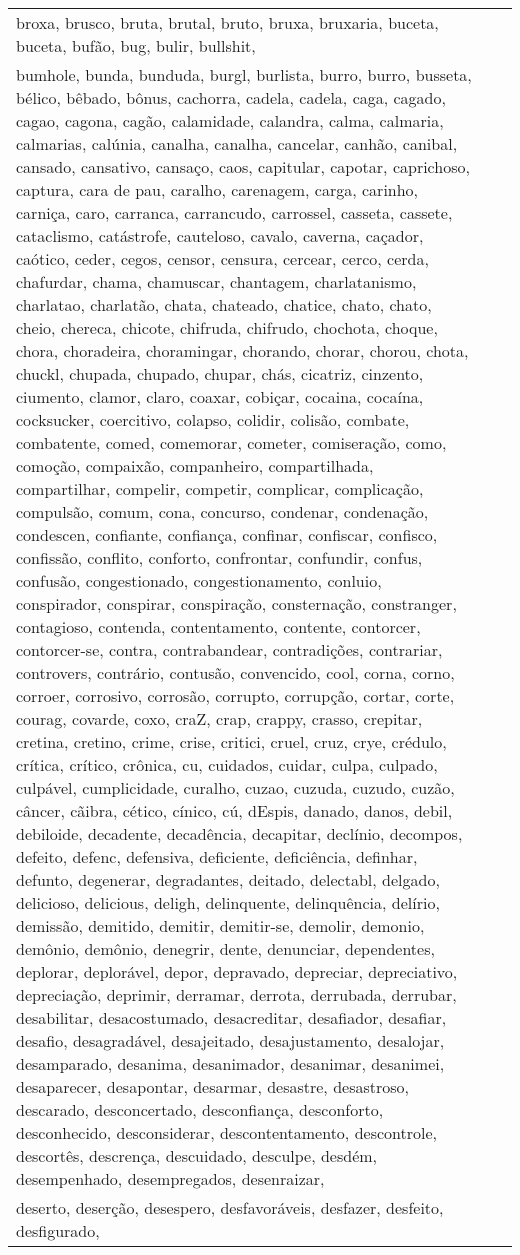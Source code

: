 \begin{longtable}{|*3{p{15cm}|}}
broxa, brusco, bruta, brutal, bruto, bruxa, bruxaria, buceta, buceta, bufão, bug, bulir, bullshit, \\ bumhole, bunda, bunduda, burgl, burlista, burro, burro, busseta, bélico, bêbado, bônus, cachorra, cadela, cadela, caga, cagado, cagao, cagona, cagão, calamidade, calandra, calma, calmaria, calmarias, calúnia, canalha, canalha, cancelar, canhão, canibal, cansado, cansativo, cansaço, caos, capitular, capotar, caprichoso, captura, cara de pau, caralho, carenagem, carga, carinho, carniça, caro, carranca, carrancudo, carrossel, casseta, cassete, cataclismo, catástrofe, cauteloso, cavalo, caverna, caçador, caótico, ceder, cegos, censor, censura, cercear, cerco, cerda, chafurdar, chama, chamuscar, chantagem, charlatanismo, charlatao, charlatão, chata, chateado, chatice, chato, chato, cheio, chereca, chicote, chifruda, chifrudo, chochota, choque, chora, choradeira, choramingar, chorando, chorar, chorou, chota, chuckl, chupada, chupado, chupar, chás, cicatriz, cinzento, ciumento, clamor, claro, coaxar, cobiçar, cocaina, cocaína, cocksucker, coercitivo, colapso, colidir, colisão, combate, combatente, comed, comemorar, cometer, comiseração, como, comoção, compaixão, companheiro, compartilhada, compartilhar, compelir, competir, complicar, complicação, compulsão, comum, cona, concurso, condenar, condenação, condescen, confiante, confiança, confinar, confiscar, confisco, confissão, conflito, conforto, confrontar, confundir, confus, confusão, congestionado, congestionamento, conluio, conspirador, conspirar, conspiração, consternação, constranger, contagioso, contenda, contentamento, contente, contorcer, contorcer-se, contra, contrabandear,  contradições, contrariar, controvers, contrário, contusão, convencido, cool, corna, corno, corroer, corrosivo, corrosão, corrupto, corrupção, cortar, corte, courag, covarde, coxo, craZ, crap, crappy, crasso, crepitar, cretina, cretino, crime, crise, critici, cruel, cruz, crye, crédulo, crítica, crítico, crônica, cu, cuidados, cuidar, culpa, culpado, culpável, cumplicidade, curalho, cuzao, cuzuda, cuzudo, cuzão, câncer, cãibra, cético, cínico, cú, dEspis, danado, danos, debil, debiloide, decadente, decadência, decapitar, declínio, decompos, defeito, defenc, defensiva, deficiente, deficiência, definhar, defunto, degenerar, degradantes, deitado, delectabl, delgado, delicioso, delicious, deligh, delinquente, delinquência, delírio, demissão, demitido, demitir, demitir-se, demolir, demonio, demônio, demônio, denegrir, dente, denunciar, dependentes, deplorar, deplorável, depor, depravado, depreciar, depreciativo, depreciação, deprimir, derramar, derrota, derrubada, derrubar, desabilitar, desacostumado, desacreditar, desafiador, desafiar, desafio, desagradável, desajeitado, desajustamento, desalojar, desamparado, desanima, desanimador, desanimar, desanimei, desaparecer, desapontar, desarmar, desastre, desastroso, descarado, desconcertado, desconfiança, desconforto, desconhecido, desconsiderar, descontentamento, descontrole, descortês, descrença, descuidado, desculpe, desdém, desempenhado, desempregados, desenraizar, \\ deserto, deserção, desespero, desfavoráveis, desfazer, desfeito, desfigurado, 
\end{longtable}
